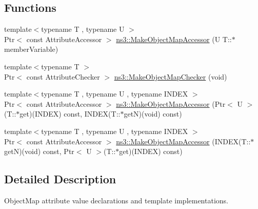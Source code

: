 \subsection*{Functions}
\begin{DoxyCompactItemize}
\item 
{\footnotesize template$<$typename T , typename U $>$ }\\Ptr$<$ const Attribute\+Accessor $>$ \hyperlink{namespacens3_acfdf708e388c66beea68eb5ecdcb7456}{ns3\+::\+Make\+Object\+Map\+Accessor} (U T\+::$\ast$member\+Variable)
\item 
{\footnotesize template$<$typename T $>$ }\\Ptr$<$ const Attribute\+Checker $>$ \hyperlink{namespacens3_abfc4b230bc4b740999caaf70d1646a1a}{ns3\+::\+Make\+Object\+Map\+Checker} (void)
\item 
{\footnotesize template$<$typename T , typename U , typename I\+N\+D\+EX $>$ }\\Ptr$<$ const Attribute\+Accessor $>$ \hyperlink{namespacens3_ad5eb13914fca5179f6047aab6e91b446}{ns3\+::\+Make\+Object\+Map\+Accessor} (Ptr$<$ U $>$(T\+::$\ast$get)(I\+N\+D\+EX) const, I\+N\+D\+EX(T\+::$\ast$getN)(void) const)
\item 
{\footnotesize template$<$typename T , typename U , typename I\+N\+D\+EX $>$ }\\Ptr$<$ const Attribute\+Accessor $>$ \hyperlink{namespacens3_adb5b22de8318b55b2960d2e948675f6a}{ns3\+::\+Make\+Object\+Map\+Accessor} (I\+N\+D\+EX(T\+::$\ast$getN)(void) const, Ptr$<$ U $>$(T\+::$\ast$get)(I\+N\+D\+EX) const)
\end{DoxyCompactItemize}


\subsection{Detailed Description}
Object\+Map attribute value declarations and template implementations. 